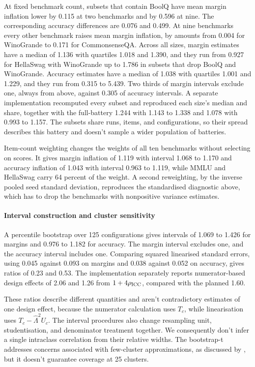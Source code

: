 At fixed benchmark count, subsets that contain BoolQ have mean margin inflation lower by 0.115 at two benchmarks and by 0.596 at nine. The corresponding accuracy differences are 0.076 and 0.499. At nine benchmarks every other benchmark raises mean margin inflation, by amounts from 0.004 for WinoGrande to 0.171 for CommonsenseQA. Across all sizes, margin estimates have a median of 1.136 with quartiles 1.018 and 1.390, and they run from 0.927 for HellaSwag with WinoGrande up to 1.786 in subsets that drop BoolQ and WinoGrande. Accuracy estimates have a median of 1.038 with quartiles 1.001 and 1.229, and they run from 0.315 to 5.439. Two thirds of margin intervals exclude one, always from above, against 0.305 of accuracy intervals. A separate implementation recomputed every subset and reproduced each size's median and share, together with the full-battery 1.244 with 1.143 to 1.338 and 1.078 with 0.993 to 1.157. The subsets share runs, items, and configurations, so their spread describes this battery and doesn't sample a wider population of batteries.

Item-count weighting changes the weights of all ten benchmarks without selecting on scores. It gives margin inflation of 1.119 with interval 1.068 to 1.170 and accuracy inflation of 1.043 with interval 0.963 to 1.119, while MMLU and HellaSwag carry 64 percent of the weight. A second reweighting, by the inverse pooled seed standard deviation, reproduces the standardised diagnostic above, which has to drop the benchmarks with nonpositive variance estimates.

\paragraph{Interval construction and cluster sensitivity}
A percentile bootstrap over 125 configurations gives intervals of 1.069 to 1.426 for margins and 0.976 to 1.182 for accuracy. The margin interval excludes one, and the accuracy interval includes one. Comparing squared linearised standard errors, using 0.045 against 0.093 on margins and 0.038 against 0.052 on accuracy, gives ratios of 0.23 and 0.53. The implementation separately reports numerator-based design effects \citep{kish1965} of 2.06 and 1.26 from $1+4\rho_{\rm ICC}$, compared with the planned 1.60.

These ratios describe different quantities and aren't contradictory estimates of one design effect, because the numerator calculation uses $T_c$, while linearisation uses $T_c-\widehat\Lambda^2U_c$. The interval procedures also change resampling unit, studentisation, and denominator treatment together. We consequently don't infer a single intraclass correlation from their relative widths. The bootstrap-t addresses concerns associated with few-cluster approximations, as discussed by \citet{bell2002}, but it doesn't guarantee coverage at 25 clusters.

